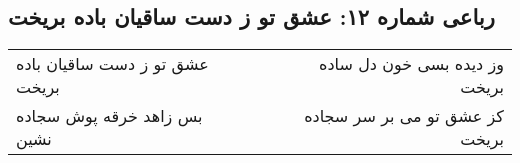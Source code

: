 \begin{center}
\section*{رباعی شماره ۱۲: عشق تو ز دست ساقیان باده بریخت}
\label{sec:012}
\begin{longtable}{l p{0.5cm} r}
عشق تو ز دست ساقیان باده بریخت
&&
وز دیده بسی خون دل ساده بریخت
\\
بس زاهد خرقه پوش سجاده نشین
&&
کز عشق تو می بر سر سجاده بریخت
\\
\end{longtable}
\end{center}
